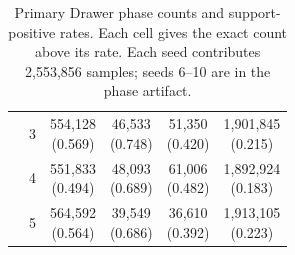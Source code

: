\begin{table}[t]
\begin{tabular}{@{}llcccc@{}}
 & 3 & \shortstack{554,128\\(0.569)} & \shortstack{46,533\\(0.748)} & \shortstack{51,350\\(0.420)} & \shortstack{1,901,845\\(0.215)} \\
 & 4 & \shortstack{551,833\\(0.494)} & \shortstack{48,093\\(0.689)} & \shortstack{61,006\\(0.482)} & \shortstack{1,892,924\\(0.183)} \\
 & 5 & \shortstack{564,592\\(0.564)} & \shortstack{39,549\\(0.686)} & \shortstack{36,610\\(0.392)} & \shortstack{1,913,105\\(0.223)} \\
\bottomrule
\end{tabular}
\vspace{45pt}
\caption{Primary Drawer phase counts and support-positive rates. Each cell gives the exact count above its rate. Each seed contributes 2,553,856 samples; seeds 6--10 are in the phase artifact.}
\label{tab:supp-phase-seed-counts}
\end{table}
